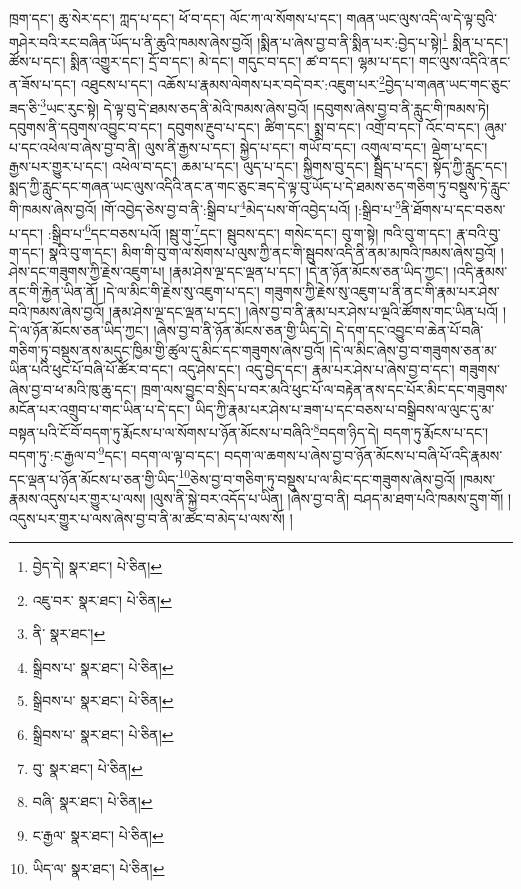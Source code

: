 ཁྲག་དང་། ཆུ་སེར་དང་། ཀླད་པ་དང་། ཕོ་བ་དང་། ལོང་ཀ་ལ་སོགས་པ་དང་། གཞན་ཡང་ལུས་འདི་ལ་དེ་ལྟ་བུའི་གཤེར་བའི་རང་བཞིན་ཡོད་པ་ནི་ཆུའི་ཁམས་ཞེས་བྱའོ། །སྨིན་པ་ཞེས་བྱ་བ་ནི་སྨིན་པར་:བྱེད་པ་སྟེ།\footnote{བྱེད་དེ།  སྣར་ཐང་།  པེ་ཅིན། } སྨིན་པ་དང་། ཚོས་པ་དང་། སྨིན་འགྱུར་དང་། དྲོ་བ་དང་། མེ་དང་། གདུང་བ་དང་། ཚ་བ་དང་། ལྷམ་པ་དང་། གང་ལུས་འདིའི་ནང་ན་ཟོས་པ་དང་། འཐུངས་པ་དང་། འཆོས་པ་རྣམས་ལེགས་པར་བདེ་བར་:འཇུག་པར་\footnote{འཇུ་བར་  སྣར་ཐང་།  པེ་ཅིན། }བྱེད་པ་གཞན་ཡང་གང་ཅུང་ཟད་ཅི་\footnote{ནི་  སྣར་ཐང་། }ཡང་རུང་སྟེ། དེ་ལྟ་བུ་དེ་ཐམས་ཅད་ནི་མེའི་ཁམས་ཞེས་བྱའོ། །དབུགས་ཞེས་བྱ་བ་ནི་རླུང་གི་ཁམས་ཏེ། དབུགས་ནི་དབུགས་འབྱུང་བ་དང་། དབུགས་རྔུབ་པ་དང་། ཚིག་དང་། སྨྲ་བ་དང་། འགྲོ་བ་དང་། འོང་བ་དང་། ཞུམ་པ་དང་འཕེལ་བ་ཞེས་བྱ་བ་ནི། ལུས་ནི་རྒྱས་པ་དང་། སྐྱེད་པ་དང་། གཡོ་བ་དང་། འགུལ་བ་དང་། ལྡེག་པ་དང་། རྒྱས་པར་གྱུར་པ་དང་། འཕེལ་བ་དང་། ཆམ་པ་དང་། ལུད་པ་དང་། སྐྱིགས་བུ་དང་། སྦྲིད་པ་དང་། སྟོད་ཀྱི་རླུང་དང་། སྨད་ཀྱི་རླུང་དང་གཞན་ཡང་ལུས་འདིའི་ནང་ན་གང་ཅུང་ཟད་དེ་ལྟ་བུ་ཡོད་པ་དེ་ཐམས་ཅད་གཅིག་ཏུ་བསྡུས་ཏེ་རླུང་གི་ཁམས་ཞེས་བྱའོ། །གོ་འབྱེད་ཅེས་བྱ་བ་ནི་:སྒྲིབ་པ་\footnote{སྒྲིབས་པ་  སྣར་ཐང་།  པེ་ཅིན། }མེད་པས་གོ་འབྱེད་པའོ། །:སྒྲིབ་པ་\footnote{སྒྲིབས་པ་  སྣར་ཐང་།  པེ་ཅིན། }ནི་ཐོགས་པ་དང་བཅས་པ་དང་། :སྒྲིབ་པ་\footnote{སྒྲིབས་པ་  སྣར་ཐང་།  པེ་ཅིན། }དང་བཅས་པའོ། །སྦུ་གུ་\footnote{བུ་  སྣར་ཐང་།  པེ་ཅིན། }དང་། སྦུབས་དང་། གསེང་དང་། བུ་ག་སྟེ། ཁའི་བུ་ག་དང་། རྣ་བའི་བུ་ག་དང་། སྣའི་བུ་ག་དང་། མིག་གི་བུ་ག་ལ་སོགས་པ་ལུས་ཀྱི་ནང་གི་སྦུབས་འདི་ནི་ནམ་མཁའི་ཁམས་ཞེས་བྱའོ། །ཤེས་དང་གཟུགས་ཀྱི་རྗེས་འཇུག་པ། །རྣམ་ཤེས་ལྔ་དང་ལྡན་པ་དང་། །དེ་ན་ཉོན་མོངས་ཅན་ཡིད་ཀྱང་། །འདི་རྣམས་ནང་གི་རྐྱེན་ཡིན་ནོ། །དེ་ལ་མིང་གི་རྗེས་སུ་འཇུག་པ་དང་། གཟུགས་ཀྱི་རྗེས་སུ་འཇུག་པ་ནི་ནང་གི་རྣམ་པར་ཤེས་བའི་ཁམས་ཞེས་བྱའོ། །རྣམ་ཤེས་ལྔ་དང་ལྡན་པ་དང་། །ཞེས་བྱ་བ་ནི་རྣམ་པར་ཤེས་པ་ལྔའི་ཚོགས་གང་ཡིན་པའོ། །དེ་ལ་ཉོན་མོངས་ཅན་ཡིད་ཀྱང་། །ཞེས་བྱ་བ་ནི་ཉོན་མོངས་ཅན་གྱི་ཡིད་དེ། དེ་དག་དང་འབྱུང་བ་ཆེན་པོ་བཞི་གཅིག་ཏུ་བསྡུས་ནས་མདུང་ཁྱིམ་གྱི་ཚུལ་དུ་མིང་དང་གཟུགས་ཞེས་བྱའོ། །དེ་ལ་མིང་ཞེས་བྱ་བ་གཟུགས་ཅན་མ་ཡིན་པའི་ཕུང་པོ་བཞི་པོ་ཚོར་བ་དང་། འདུ་ཤེས་དང་། འདུ་བྱེད་དང་། རྣམ་པར་ཤེས་པ་ཞེས་བྱ་བ་དང་། གཟུགས་ཞེས་བྱ་བ་ཕ་མའི་ཁུ་ཆུ་དང་། ཁྲག་ལས་བྱུང་བ་སྲིད་པ་བར་མའི་ཕུང་པོ་ལ་བརྟེན་ནས་དང་པོར་མིང་དང་གཟུགས་མངོན་པར་འགྲུབ་པ་གང་ཡིན་པ་དེ་དང་། ཡིད་ཀྱི་རྣམ་པར་ཤེས་པ་ཟག་པ་དང་བཅས་པ་བསྒྲིབས་ལ་ལུང་དུ་མ་བསྟན་པའི་ངོ་བོ་བདག་ཏུ་རྨོངས་པ་ལ་སོགས་པ་ཉོན་མོངས་པ་བཞིའི་\footnote{བཞི་  སྣར་ཐང་།  པེ་ཅིན། }བདག་ཉིད་དེ། བདག་ཏུ་རྨོངས་པ་དང་། བདག་ཏུ་:ང་རྒྱལ་བ་\footnote{ང་རྒྱལ་  སྣར་ཐང་།  པེ་ཅིན། }དང་། བདག་ལ་ལྟ་བ་དང་། བདག་ལ་ཆགས་པ་ཞེས་བྱ་བ་ཉོན་མོངས་པ་བཞི་པོ་འདི་རྣམས་དང་ལྡན་པ་ཉོན་མོངས་པ་ཅན་གྱི་ཡིད་\footnote{ཡིད་ལ་  སྣར་ཐང་།  པེ་ཅིན། }ཅེས་བྱ་བ་གཅིག་ཏུ་བསྡུས་པ་ལ་མིང་དང་གཟུགས་ཞེས་བྱའོ། །ཁམས་རྣམས་འདུས་པར་གྱུར་པ་ལས། །ལུས་ནི་སྐྱེ་བར་འདོད་པ་ཡིན། །ཞེས་བྱ་བ་ནི། བཤད་མ་ཐག་པའི་ཁམས་དྲུག་གོ། །འདུས་པར་གྱུར་པ་ལས་ཞེས་བྱ་བ་ནི་མ་ཚང་བ་མེད་པ་ལས་སོ། །

